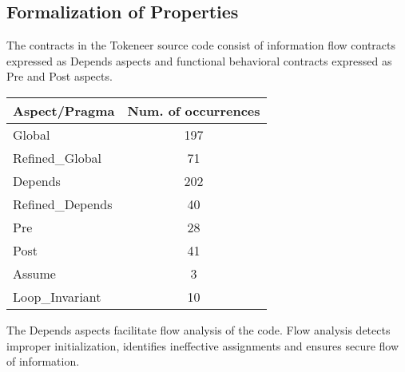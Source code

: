\documentclass[10pt,a4paper,twocolumn]{article}
\newcommand{\oldspark}{SPARK~2005\xspace}
\begin{document}




\subsection{Formalization of Properties}

The contracts in the Tokeneer source code consist
of information flow contracts expressed as Depends aspects and
functional behavioral contracts expressed as Pre and Post aspects.

\begin{tabular}{|l|c|}
\hline
{\bf Aspect/Pragma}       & {\bf Num. of occurrences}  \\
\hline
Global              & 197 \\
\hline
Refined\_Global     & 71 \\
\hline
Depends             & 202 \\
\hline
Refined\_Depends    & 40 \\
\hline
Pre                 & 28 \\
\hline
Post                & 41 \\
\hline
Assume              & 3 \\
\hline
Loop\_Invariant     & 10 \\
\hline
\end{tabular}

The Depends aspects facilitate flow analysis of the code. Flow
analysis detects improper initialization, identifies ineffective
assignments and ensures secure flow of information.
\end{document}
